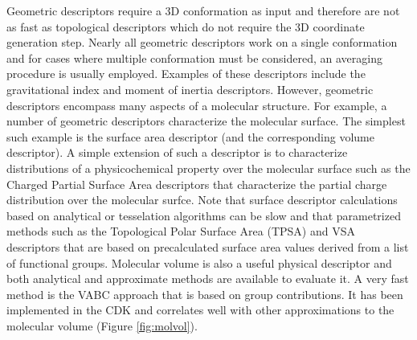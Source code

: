 \documentclass[letterpaper, 12pt]{article}
\begin{document}
Geometric descriptors require a 3D conformation as input and therefore
are not as fast as topological descriptors which do not require the 3D
coordinate generation step. Nearly all geometric descriptors work on a
single conformation and for cases where multiple conformation must be
considered, an averaging procedure is usually employed. Examples of
these descriptors include the gravitational index
\cite{Katritzky:1996ly} and moment of inertia descriptors. However,
geometric descriptors encompass many aspects of a molecular
structure. For example, a number of geometric descriptors characterize
the molecular surface. The simplest such example is the surface area
descriptor (and the corresponding volume descriptor). A simple
extension of such a descriptor is to characterize distributions of a
physicochemical property over the molecular surface such as the
Charged Partial Surface Area descriptors \cite{Stanton:1990aa} that
characterize the partial charge distribution over the molecular
surfce. Note that surface descriptor calculations based on analytical
\cite{Connolly:1983aa} or tesselation algorithms
\cite{Eisenhaber:1995qf} can be slow and that parametrized methods
such as the Topological Polar Surface Area (TPSA) \cite{Ertl:2000aa}
and VSA descriptors \cite{Labute:2008aa} that are based on
precalculated surface area values derived from a list of functional
groups.  Molecular volume is also a useful physical descriptor and
both analytical \cite{Eisenhaber:1995qf} and approximate methods are
available to evaluate it. A very fast method is the VABC approach
\cite{Zhao:2003fk} that is based on group contributions. It has been
implemented in the CDK and correlates well with other approximations
to the molecular volume (Figure \ref{fig:molvol}).
\end{document}
